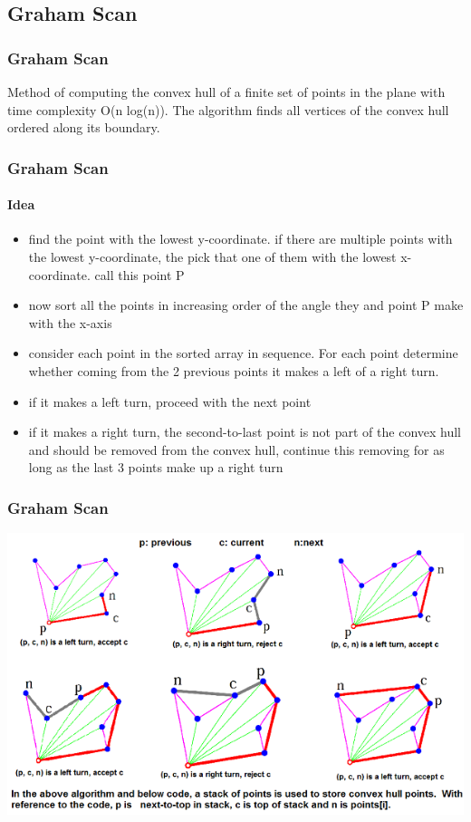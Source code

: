 \subsection[Graham]{Graham Scan}

\begin{frame}
\frametitle{Graham Scan}
Method of computing the convex hull of a finite set of points in the plane with time complexity O(n log(n)). The algorithm finds all vertices of the convex hull ordered along its boundary.
\end{frame}

\begin{frame}
\frametitle{Graham Scan}
\framesubtitle{Idea}
\begin{itemize}
\item find the point with the lowest y-coordinate. if there are multiple points with the lowest y-coordinate, the pick that one of them with the lowest x-coordinate. call this point P
\item now sort all the points in increasing order of the angle they and point P make with the x-axis
\item consider each point in the sorted array in sequence. For each point determine whether coming from the 2 previous points it makes a left of a right turn.
\item if it makes a left turn, proceed with the next point
\item if it makes a right turn, the second-to-last point is not part of the convex hull and should be removed from the convex hull, continue this removing for as long as the last 3 points make up a right turn 
\end{itemize}
\end{frame}

\begin{frame}
\frametitle{Graham Scan}
\includegraphics[width=1\textwidth]{./2-convex/img/graham}
\end{frame}

